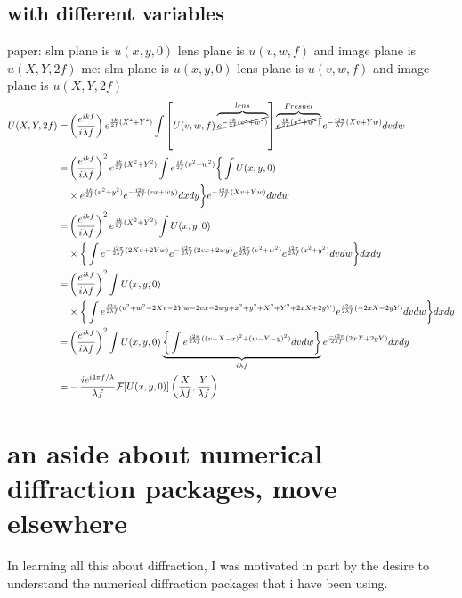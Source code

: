 \documentclass[../../main.tex]{subfiles}
\begin{document}
\subsection{with different variables}
paper: slm plane is $u(x,y,0)$ lens plane is $u(v,w,f)$ and image plane is $u(X,Y,2f)$
me:  slm plane is $u(x,y,0)$ lens plane is $u(v,w,f)$ and image plane is $u(X,Y,2f)$
\begin{equation}
    \begin{aligned}
    U(X,Y,2f)=&\left(\frac{e^{ikf}}{i\lambda f}\right)e^{\frac{ik}{2 f}(X^2+Y^2)}
    \int \left[U(v,w,f)
    \overbrace{\cancel{e^{-\frac{ik}{2f}(v^2+w^2)}}}^{lens
    }\right]
    \overbrace{\cancel{e^{ \frac{ik}{2f}(v^2+w^2)}}}^{Fresnel}
    e^{-\frac{i 2\pi}{\lambda f}(Xv+Yw)}dv dw\\
    =&\left(\frac{e^{ikf}}{i\lambda f}\right)^2e^{\frac{ik}{2 f}(X^2+Y^2)}
    \int e^{\frac{ik}{2 f}(v^2+w^2)} \bigg\{\int U(x,y,0)\\
    &\times  e^{ \frac{ik}{2f}(x^2+y^2)}e^{-\frac{i 2\pi}{\lambda f}(v x+w y)}
      dx dy\bigg\} e^{-\frac{i 2\pi}{\lambda f}(Xv+Yw)} dv dw\\
    =&\left(\frac{e^{ikf}}{i\lambda f}\right)^2e^{\frac{ik}{2 f}(X^2+Y^2)}
    \int U(x,y,0) \\
    &\times\bigg\{\int   
    e^{-\frac{i 2\pi}{2 \lambda f}(2Xv+2Yw)} 
    e^{-\frac{i 2\pi}{2 \lambda f}(2v x+2w y)} 
    e^{\frac{i2\pi}{2 \lambda f}(v^2+w^2)} 
    e^{ \frac{i2\pi}{2 \lambda f}(x^2+y^2)}
    dv dw\bigg\} dx dy\\
    =&\left(\frac{e^{ikf}}{i\lambda f}\right)^2
    \int U(x,y,0) \\
    &\times\bigg\{\int   
    e^{\frac{i 2\pi}{2 \lambda f}(v^2+w^2-2Xv-2Yw-2v x-2w y+x^2+y^2+X^2+Y^2 +2xX+2yY)}
    e^{\frac{i 2\pi}{2 \lambda f}(-2xX-2yY)}
    dv dw\bigg\} dx dy\\
    =&\left(\frac{e^{ikf}}{i\lambda f}\right)^2
    \int U(x,y,0) \underbrace{\bigg\{\int   
    e^{\frac{i 2\pi}{2 \lambda f}((v-X-x)^2+(w-Y-y)^2)} 
    dv dw\bigg\}}_{i\lambda f}  e^{\frac{-i 2\pi}{2 \lambda f}(2xX+2yY)}dx dy\\
    =&-\frac{ie^{i4\pi f/\lambda}}{\lambda f}\mathcal{F}[U(x,y,0)]\left(\frac{X}{\lambda f},\frac{Y}{\lambda f}\right)
    \end{aligned}
\end{equation}
\section{an aside about numerical diffraction packages, move elsewhere}
In learning all this about diffraction, I was motivated in part by the desire to understand the numerical diffraction packages that i have been using. 
\end{document}
